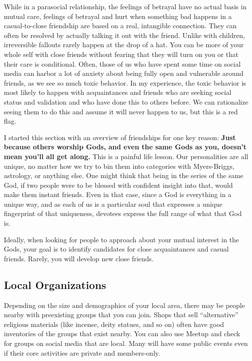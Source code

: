 \documentclass[
]{book}
\begin{document}
While in a parasocial relationship, the feelings of betrayal have no actual basis in mutual care, feelings of betrayal and hurt when something bad happens in a casual-to-close friendship are based on a real, intangible connection. They can often be resolved by actually talking it out with the friend. Unlike with children, irreversible fallouts rarely happen at the drop of a hat. You can be more of your whole self with close friends without fearing that they will turn on you or that their care is conditional. Often, those of us who have spent some time on social media can harbor a lot of anxiety about being fully open and vulnerable around friends, as we see so much toxic behavior. In my experience, the toxic behavior is most likely to happen with acquaintances and friends who are seeking social status and validation and who have done this to others before. We can rationalize seeing them to do this and assume it will never happen to us, but this is a red flag.

I started this section with an overview of friendships for one key reason: \textbf{Just because others worship Gods, and even the same Gods as you, doesn't mean you'll all get along.} This is a painful life lesson. Our personalities are all unique, no matter how we try to bin them into categories with Myers-Briggs, astrology, or anything else. One might think that being in the series of the same God, if two people were to be blessed with confident insight into that, would make them instant friends. Even in that case, since a God is everything in a unique way, and as each of us is a particular soul that expresses a unique fingerprint of that uniqueness, devotees express the full range of what that God is.

Ideally, when looking for people to approach about your mutual interest in the Gods, your goal is to identify candidates for close acquaintances and casual friends. Rarely, you will develop new close friends.

\hypertarget{local-organizations}{%
\subsection{Local Organizations}\label{local-organizations}}

Depending on the size and demographics of your local area, there may be people nearby with preexisting groups that you can join. Shops that sell ``alternative'' religious materials (like incense, deity statues, and so on) often have good inventories of the groups that exist nearby. You can also use Meetup and check for groups on social media that are local. Many will have some public events even if their core activities are private and members-only.
\end{document}
